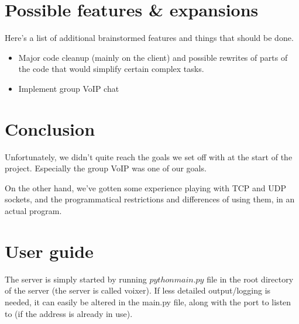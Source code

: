\documentclass[12pt]{rapport}
\begin{document}
\section*{Possible features \& expansions}
Here's a list of additional brainstormed features and things that
should be done.
\begin{itemize}
\item Major code cleanup (mainly on the client) and possible
  rewrites of parts of the code that would simplify certain complex
  tasks.
\item Implement group VoIP chat
\end{itemize}


\newpage
\section*{Conclusion}
Unfortunately, we didn't quite reach the goals we set off with at the 
start of the project. Especially the group VoIP was one of our goals.

On the other hand, we've gotten some experience playing with TCP and UDP
sockets, and the programmatical restrictions and differences of using them,
in an actual program. 



\newpage
\section*{User guide}
The server is simply started by running $python main.py$ file in the 
root directory of the server (the server is called voixer). If less 
detailed output/logging is needed, it can easily be altered in the 
main.py file, along with the port to listen to (if the address is 
already in use).
\end{document}
